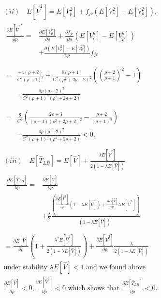 \documentclass[sigconf,draft]{acmart}
\begin{document}
\begin{equation*}
  \begin{split}
  & (ii)\quad E[\hat{V}^2] = E[V_p^2] + f_{jc}(E[V_c^2] - E[V_p^2]), \\
  & \begin{aligned}
    \frac{\partial E[\hat{V}^2]}{\partial \rho} =& \frac{\partial E[V_p^2]}{\partial \rho} + \frac{\partial f_{jc}}{\partial \rho}(E[V_c^2]-E[V_p^2]) \\
    &+ \frac{\partial (E[V_c^2]-E[V_p^2])}{\partial \rho}f_{jc} \\
    \end{aligned} \\
  & \begin{aligned}
    =& \frac{-4(\rho+2)}{C^2(\rho+1)^3} + \frac{8(\rho+1)}{C^2(\rho^2+2\rho+2)^2}((\frac{\rho+2}{\rho+1})^2-1) \\
    &- \frac{4\rho(\rho+2)^2}{C^2(\rho+1)^3(\rho^2+2\rho+2)} \\
   \end{aligned} \\
  & \begin{aligned}
   =& \frac{8}{C^2}(\frac{2\rho+3}{(\rho+1)(\rho^2+2\rho+2)^2} - \frac{\rho+2}{(\rho+1)^3}) \\
   &- \frac{4\rho(\rho+2)^2}{C^2(\rho+1)^3(\rho^2+2\rho+2)} < 0,
   \end{aligned} \\
  \end{split}
\end{equation*}
\begin{equation*}
  \begin{split}
  & (iii)\quad E[\hat{T}_{LB}] = E[\hat{V}] + \frac{\lambda E[\hat{V}^2]}{2(1 - \lambda E[\hat{V}])} \\
  & \begin{aligned}
    \frac{\partial E[\hat{T}_{LB}]}{\partial \rho} =& \frac{\partial E[\hat{V}]}{\partial \rho} \\
    &+ \frac{\lambda}{2}\frac{(\frac{\partial E[\hat{V}^2]}{\partial \rho}(1-\lambda E[\hat{V}]) + \frac{\partial E[\hat{V}]}{\partial \rho}\lambda E[\hat{V}^2])}{(1-\lambda E[\hat{V}])^2} \\
    \end{aligned} \\
  &= \frac{\partial E[\hat{V}]}{\partial \rho}(1 + \frac{\lambda^2 E[\hat{V}^2]}{2(1-\lambda E[\hat{V}])}) + \frac{\partial E[\hat{V}^2]}{\partial \rho}\frac{\lambda}{2(1-\lambda E[\hat{V}])} \\
  & \text{under stability } \lambda E[\hat{V}] < 1 \text{ and we found above } \\
  & \frac{\partial E[\hat{V}]}{\partial \rho} < 0, \frac{\partial E[\hat{V}^2]}{\partial \rho} < 0 \text{ which shows that } \frac{\partial E[\hat{T}_{LB}]}{\partial \rho} < 0.
  \end{split}
\end{equation*}
\end{document}
